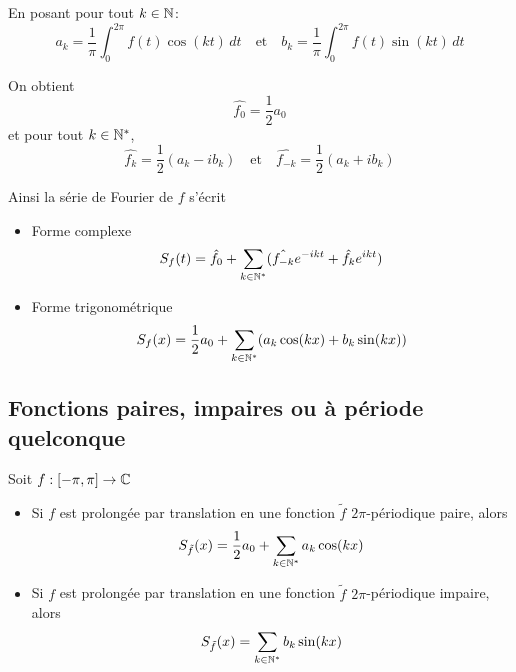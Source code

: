 \documentclass[a4paper,12pt]{article}
\begin{document}
\begin{theoreme}{}{}
    En posant pour tout $k \in \mathbb{N}$:
    $$
    a_k = \frac{1}{\pi} \int_0^{2\pi} f(t) \cos(kt) \, dt \quad \text{et} \quad b_k = \frac{1}{\pi} \int_0^{2\pi} f(t) \sin(kt) \, dt
    $$

    On obtient
    $$
    \hat{f_0} = \frac{1}{2} a_0
    $$
    et pour tout $k \in \mathbb{N}^*$,
    $$
    \hat{f_k} = \frac{1}{2} (a_k - i b_k) \quad \text{et} \quad \hat{f_{-k}} = \frac{1}{2} (a_k + i b_k)
    $$

    Ainsi la série de Fourier de $f$ s'écrit
    
    \begin{itemize}[label=\textbullet]
        \item Forme complexe
        $$
        S_f(t) = \hat{f_0} + \sum_{k \in \mathbb{N}^*} (\hat{f_{-k}} e^{-ikt} + \hat{f_k} e^{ikt})
        $$

        \item Forme trigonométrique
        $$
        S_f(x) = \frac{1}{2} a_0 + \sum_{k \in \mathbb{N}^*} (a_k \cos(kx) + b_k \sin(kx))
        $$
    \end{itemize}
\end{theoreme}

\subsection{Fonctions paires, impaires ou à période quelconque}

\begin{theoreme}{}{}
    Soit $f : [-\pi, \pi] \to \mathbb{C}$

    \begin{itemize}[label=\textbullet]
        \item Si $f$ est prolongée par translation en une fonction $\tilde{f}$ $2\pi$-périodique paire, alors
        $$
        S_{\tilde{f}}(x) = \frac{1}{2} a_0 + \sum_{k \in \mathbb{N}^*} a_k \cos(kx)
        $$

        \item Si $f$ est prolongée par translation en une fonction $\tilde{f}$ $2\pi$-périodique impaire, alors
        $$
        S_{\tilde{f}}(x) = \sum_{k \in \mathbb{N}^*} b_k \sin(kx)
        $$
    \end{itemize}
\end{theoreme}
\end{document}
